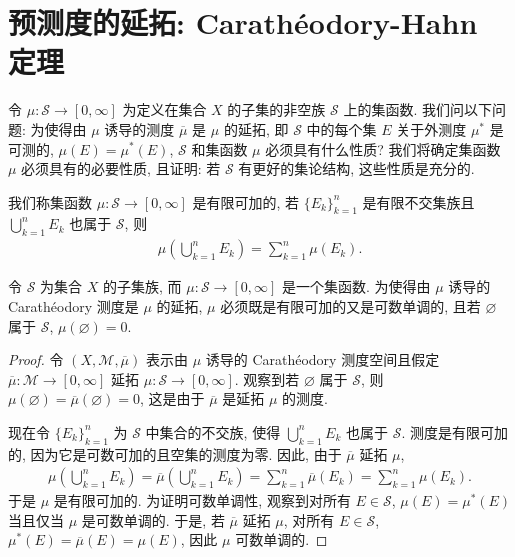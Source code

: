 \documentclass[../../main.tex]{subfiles}
\begin{document}
\section{预测度的延拓: Carath\'eodory-Hahn 定理}\label{section:ch17-caratheodory-hahn}

令 $\mu:\mathcal{S}\to[0,\infty]$ 为定义在集合 $X$ 的子集的非空族 $\mathcal{S}$ 上的集函数. 我们问以下问题: 为使得由 $\mu$ 诱导的测度 $\overline{\mu}$ 是 $\mu$ 的延拓, 即 $\mathcal{S}$ 中的每个集 $E$ 关于外测度 $\mu^*$ 是可测的, $\mu(E)=\mu^*(E)$, $\mathcal{S}$ 和集函数 $\mu$ 必须具有什么性质? 我们将确定集函数 $\mu$ 必须具有的必要性质, 且证明: 若 $\mathcal{S}$ 有更好的集论结构, 这些性质是充分的.

我们称集函数 $\mu:\mathcal{S}\to[0,\infty]$ 是有限可加的, 若 $\{E_{k}\}_{k=1}^{n}$ 是有限不交集族且 $\bigcup_{k=1}^{n}E_{k}$ 也属于 $\mathcal{S}$, 则
\begin{align*}
\mu\left(\bigcup_{k=1}^{n}E_{k}\right)=\sum_{k=1}^{n}\mu(E_{k}).
\end{align*}

\begin{proposition}\label{proposition:ch17-extension-necessary}
令 $\mathcal{S}$ 为集合 $X$ 的子集族, 而 $\mu:\mathcal{S}\to[0,\infty]$ 是一个集函数. 为使得由 $\mu$ 诱导的 Carath\'eodory 测度是 $\mu$ 的延拓, $\mu$ 必须既是有限可加的又是可数单调的, 且若 $\varnothing$ 属于 $\mathcal{S}$, $\mu(\varnothing)=0$.
\end{proposition}

\begin{proof}
令 $(X,\mathcal{M},\overline{\mu})$ 表示由 $\mu$ 诱导的 Carath\'eodory 测度空间且假定 $\overline{\mu}:\mathcal{M}\to[0,\infty]$ 延拓 $\mu:\mathcal{S}\to[0,\infty]$. 观察到若 $\varnothing$ 属于 $\mathcal{S}$, 则 $\mu(\varnothing)=\overline{\mu}(\varnothing)=0$, 这是由于 $\overline{\mu}$ 是延拓 $\mu$ 的测度.

现在令 $\{E_{k}\}_{k=1}^{n}$ 为 $\mathcal{S}$ 中集合的不交族, 使得 $\bigcup_{k=1}^{n}E_{k}$ 也属于 $\mathcal{S}$. 测度是有限可加的, 因为它是可数可加的且空集的测度为零. 因此, 由于 $\overline{\mu}$ 延拓 $\mu$,
\begin{align*}
\mu\left(\bigcup_{k=1}^{n}E_{k}\right)=\overline{\mu}\left(\bigcup_{k=1}^{n}E_{k}\right)=\sum_{k=1}^{n}\overline{\mu}(E_{k})=\sum_{k=1}^{n}\mu(E_{k}).
\end{align*}
于是 $\mu$ 是有限可加的. 为证明可数单调性, 观察到对所有 $E\in\mathcal{S}$, $\mu(E)=\mu^*(E)$ 当且仅当 $\mu$ 是可数单调的. 于是, 若 $\overline{\mu}$ 延拓 $\mu$, 对所有 $E\in\mathcal{S}$, $\mu^*(E)=\overline{\mu}(E)=\mu(E)$, 因此 $\mu$ 可数单调的.
\end{proof}
\end{document}
